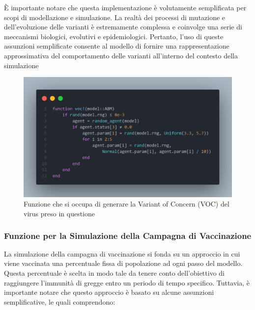 È importante notare che questa implementazione è volutamente 
semplificata per scopi di modellazione e simulazione. 
La realtà dei processi di mutazione e dell'evoluzione delle varianti è 
estremamente complessa e coinvolge una serie di meccanismi biologici, 
evolutivi e epidemiologici. Pertanto, l'uso di queste assunzioni 
semplificate consente al modello di fornire una rappresentazione 
approssimativa del comportamento delle varianti all'interno del 
contesto della simulazione \cite{Abavisani2022} \cite{Markov2023} 
\cite{https://doi.org/10.1002/jmv.27331} 

\begin{figure}[H]
    \begin{center}
		\includegraphics[scale=0.28]{img/voc.png}
		\caption{Funzione che si occupa di generare la Variant of Concern (VOC) del virus preso in questione}
		\label{fig:voc}
	\end{center}
\end{figure}

\subsubsection{Funzione per la Simulazione della Campagna di Vaccinazione}

La simulazione della campagna di vaccinazione si fonda su un approccio 
in cui viene vaccinata una percentuale fissa di popolazione ad ogni 
passo del modello. Questa percentuale è scelta in modo tale da tenere 
conto dell'obiettivo di raggiungere l'immunità di gregge entro un 
periodo di tempo specifico. Tuttavia, è importante notare che questo 
approccio è basato su alcune assunzioni semplificative, le quali 
comprendono:

